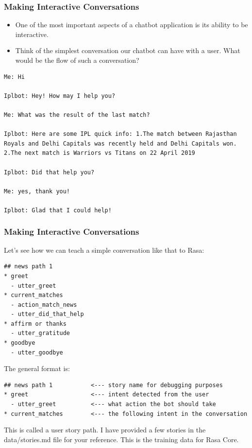  \begin{frame}[fragile]\frametitle{Making Interactive Conversations}

 
\begin{itemize}
\item  One of the most important aspects of a chatbot application is its ability to be interactive.
 
\item Think of the simplest conversation our chatbot can have with a user. What would be the flow of such a conversation?
\end{itemize}
\begin{lstlisting}
Me: Hi

Iplbot: Hey! How may I help you?

Me: What was the result of the last match?

Iplbot: Here are some IPL quick info: 1.The match between Rajasthan Royals and Delhi Capitals was recently held and Delhi Capitals won. 2.The next match is Warriors vs Titans on 22 April 2019

Iplbot: Did that help you?

Me: yes, thank you!

Iplbot: Glad that I could help!
\end{lstlisting}
\end{frame}

 \begin{frame}[fragile]\frametitle{Making Interactive Conversations}

Let's see how we can teach a simple conversation like that to Rasa:

\begin{lstlisting}
## news path 1
* greet
  - utter_greet
* current_matches
  - action_match_news
  - utter_did_that_help
* affirm or thanks
  - utter_gratitude
* goodbye
  - utter_goodbye
\end{lstlisting}

The general format is:

\begin{lstlisting}
## news path 1           <--- story name for debugging purposes
* greet                  <--- intent detected from the user
  - utter_greet          <--- what action the bot should take
* current_matches        <--- the following intent in the conversation
\end{lstlisting}

This is called a user story path. I have provided a few stories in the data/stories.md file for your reference. This is the training data for Rasa Core.
\end{frame}


